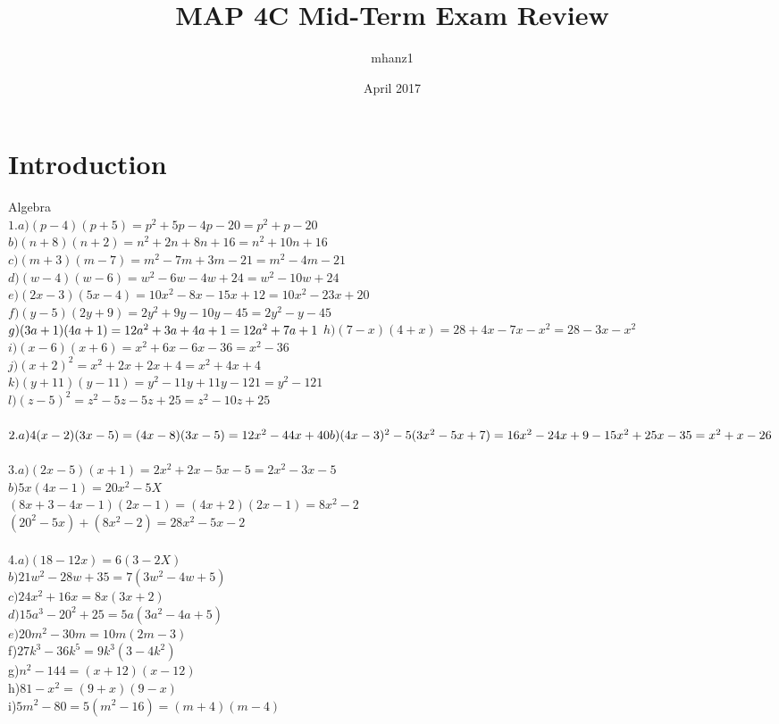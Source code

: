 \documentclass{article}
\title{MAP 4C  Mid-Term Exam Review}
\author{mhanz1 }
\date{April 2017}
\begin{document}
\maketitle

\section{Introduction}
Algebra\\
$1. a) (p-4)(p+5)=p^2+5p-4p-20=p^2+p-20$ \\
$b)(n+8)(n+2)=n^2+2n+8n+16=n^2+10n+16$\\
$c)(m+3)(m-7)=m^2-7m+3m-21=m^2-4m-21$\\
$d)(w-4)(w-6)=w^2-6w-4w+24=w^2-10w+24$\\
$e)(2x-3)(5x-4)=10x^2-8x-15x+12=10x^2-23x+20$\\
$f)(y-5)(2y+9)=2y^2+9y-10y-45=2y^2-y-45$\\
$g)(3a+1)(4a+1)=12a^2+3a+4a+1=12a^2+7a+1\\$
$h)(7-x)(4+x)=28+4x-7x-x^2=28-3x-x^2$\\
$i)(x-6)(x+6)=x^2+6x-6x-36=x^2-36$\\
$j)(x+2)^2=x^2+2x+2x+4=x^2+4x+4$\\
$k)(y+11)(y-11)=y^2-11y+11y-121=y^2-121$\\
$l)(z-5)^2=z^2-5z-5z+25=z^2-10z+25$\\
\\
$2.a)4(x-2)(3x-5)=(4x-8)(3x-5)=12x^2-44x+40\\
b)(4x-3)^2-5(3x^2-5x+7)=16x^2-24x+9-15x^2+25x-35=x^2+x-26$\\
\\
3.$a)(2x-5)(x+1)=2x^2+2x-5x-5=2x^2-3x-5$ \\
$b)5x(4x-1)=20x^2-5X$\\
$(8x+3-4x-1)(2x-1)=(4x+2)(2x-1)=8x^2-2$\\
$(20^2-5x)+(8x^2-2)=28x^2-5x-2$\\
\\
4.$a)(18-12x)=6(3-2X)$\\
$b)21w^2-28w+35=7(3w^2-4w+5)$\\
$c)24x^2+16x=8x(3x+2)$\\
$d)15a^3-20^2+25=5a(3a^2-4a+5)$\\
$e)20m^2-30m=10m(2m-3)$\\
f)$27k^3-36k^5=9k^3(3-4k^2)$\\
g)$n^2-144=(x+12)(x-12)$\\
h)$81-x^2=(9+x)(9-x)$\\
i)$5m^2-80=5(m^2-16)=(m+4)(m-4)$\\
\end{document}
